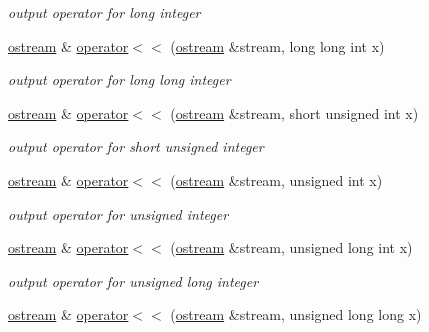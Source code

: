 \begin{DoxyCompactItemize}
\begin{DoxyCompactList}\small\item\em output operator for long integer \end{DoxyCompactList}\item 
\hyperlink{classhwlib_1_1ostream}{ostream} \& \hyperlink{classhwlib_1_1ostream_a25a0b9be93f8f9ed789cef2411acbed2}{operator$<$$<$} (\hyperlink{classhwlib_1_1ostream}{ostream} \&stream, long long int x)\hypertarget{classhwlib_1_1ostream_a25a0b9be93f8f9ed789cef2411acbed2}{}\label{classhwlib_1_1ostream_a25a0b9be93f8f9ed789cef2411acbed2}

\begin{DoxyCompactList}\small\item\em output operator for long long integer \end{DoxyCompactList}\item 
\hyperlink{classhwlib_1_1ostream}{ostream} \& \hyperlink{classhwlib_1_1ostream_a2c5c3586c979f880097499e392bcbf54}{operator$<$$<$} (\hyperlink{classhwlib_1_1ostream}{ostream} \&stream, short unsigned int x)\hypertarget{classhwlib_1_1ostream_a2c5c3586c979f880097499e392bcbf54}{}\label{classhwlib_1_1ostream_a2c5c3586c979f880097499e392bcbf54}

\begin{DoxyCompactList}\small\item\em output operator for short unsigned integer \end{DoxyCompactList}\item 
\hyperlink{classhwlib_1_1ostream}{ostream} \& \hyperlink{classhwlib_1_1ostream_ae70e52926d415af7bfd483c29322f6a1}{operator$<$$<$} (\hyperlink{classhwlib_1_1ostream}{ostream} \&stream, unsigned int x)\hypertarget{classhwlib_1_1ostream_ae70e52926d415af7bfd483c29322f6a1}{}\label{classhwlib_1_1ostream_ae70e52926d415af7bfd483c29322f6a1}

\begin{DoxyCompactList}\small\item\em output operator for unsigned integer \end{DoxyCompactList}\item 
\hyperlink{classhwlib_1_1ostream}{ostream} \& \hyperlink{classhwlib_1_1ostream_a7df95ef6e7402e0238681b5a0ee1a4f6}{operator$<$$<$} (\hyperlink{classhwlib_1_1ostream}{ostream} \&stream, unsigned long int x)\hypertarget{classhwlib_1_1ostream_a7df95ef6e7402e0238681b5a0ee1a4f6}{}\label{classhwlib_1_1ostream_a7df95ef6e7402e0238681b5a0ee1a4f6}

\begin{DoxyCompactList}\small\item\em output operator for unsigned long integer \end{DoxyCompactList}\item 
\hyperlink{classhwlib_1_1ostream}{ostream} \& \hyperlink{classhwlib_1_1ostream_a7ab00ab622e0e7c42198f34597713390}{operator$<$$<$} (\hyperlink{classhwlib_1_1ostream}{ostream} \&stream, unsigned long long x)\hypertarget{classhwlib_1_1ostream_a7ab00ab622e0e7c42198f34597713390}{}\label{classhwlib_1_1ostream_a7ab00ab622e0e7c42198f34597713390}


\end{DoxyCompactItemize}

